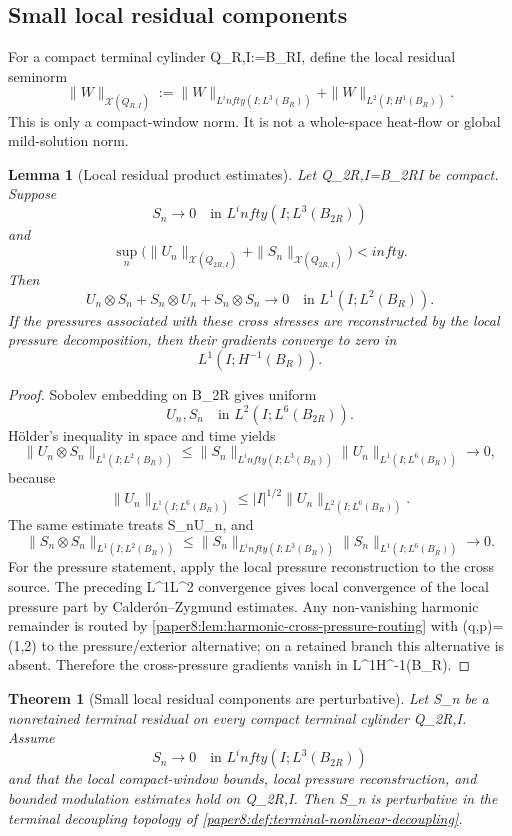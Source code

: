 \documentclass[11pt]{amsart}
\def\({}%
\def\){}%
\def\infty{infty}%
\theoremstyle{plain}
\newtheorem{theorem}{Theorem}[section]
\newtheorem{lemma}[lemma]{Lemma}
\theoremstyle{definition}
\theoremstyle{remark}
\begin{document}
\subsection{Small local residual components}

For a compact terminal cylinder \(Q_{R,I}:=B_R\times I\), define the local
residual seminorm
\[
  \|W\|_{\mathcal X(Q_{R,I})}
  :=
  \|W\|_{L^\infty(I;L^3(B_R))}
  +
  \|W\|_{L^2(I;H^1(B_R))}.
\]
This is only a compact-window norm.  It is not a whole-space heat-flow or
global mild-solution norm.

\begin{lemma}[Local residual product estimates]
\label{paper8:lem:kato-estimates}
Let \(Q_{2R,I}=B_{2R}\times I\) be compact.  Suppose
\[
  S_n\to0\quad\text{in }L^\infty(I;L^3(B_{2R}))
\]
and
\[
  \sup_n\bigl(\|U_n\|_{\mathcal X(Q_{2R,I})}
  +\|S_n\|_{\mathcal X(Q_{2R,I})}\bigr)<\infty .
\]
Then
\[
  U_n\otimes S_n+S_n\otimes U_n+S_n\otimes S_n
  \to0
  \quad\text{in }L^1(I;L^2(B_R)).
\]
If the pressures associated with these cross stresses are reconstructed by the
local pressure decomposition, then their gradients converge to zero in
\[
  L^1(I;H^{-1}(B_R)).
\]
\end{lemma}

\begin{proof}
Sobolev embedding on \(B_{2R}\) gives uniform
\[
  U_n,S_n\quad\text{in }L^2(I;L^6(B_{2R})).
\]
Hölder's inequality in space and time yields
\[
  \|U_n\otimes S_n\|_{L^1(I;L^2(B_R))}
  \le
  \|S_n\|_{L^\infty(I;L^3(B_R))}
  \|U_n\|_{L^1(I;L^6(B_R))}\to0,
\]
because
\[
  \|U_n\|_{L^1(I;L^6(B_R))}
  \le |I|^{1/2}\|U_n\|_{L^2(I;L^6(B_R))}.
\]
The same estimate treats \(S_n\otimes U_n\), and
\[
  \|S_n\otimes S_n\|_{L^1(I;L^2(B_R))}
  \le
  \|S_n\|_{L^\infty(I;L^3(B_R))}
  \|S_n\|_{L^1(I;L^6(B_R))}\to0.
\]
For the pressure statement, apply the local pressure reconstruction to the
cross source.  The preceding \(L^1L^2\) convergence gives local convergence of
the local pressure part by Calder\'on--Zygmund estimates.  Any non-vanishing
harmonic remainder is routed by
\cref{paper8:lem:harmonic-cross-pressure-routing} with \((q,p)=(1,2)\) to the pressure/exterior
alternative; on a retained branch this alternative is absent.  Therefore the
cross-pressure gradients vanish in \(L^1H^{-1}(B_R)\).
\end{proof}

\begin{theorem}[Small local residual components are perturbative]
\label{paper8:thm:small-data-critical}
Let \(S_n\) be a nonretained terminal residual on every compact terminal
cylinder \(Q_{2R,I}\).  Assume
\[
  S_n\to0\quad\text{in }L^\infty(I;L^3(B_{2R}))
\]
and that the local compact-window bounds, local pressure reconstruction, and
bounded modulation estimates hold on \(Q_{2R,I}\).  Then \(S_n\) is
perturbative in the terminal decoupling topology of
\cref{paper8:def:terminal-nonlinear-decoupling}.
\end{theorem}
\end{document}
